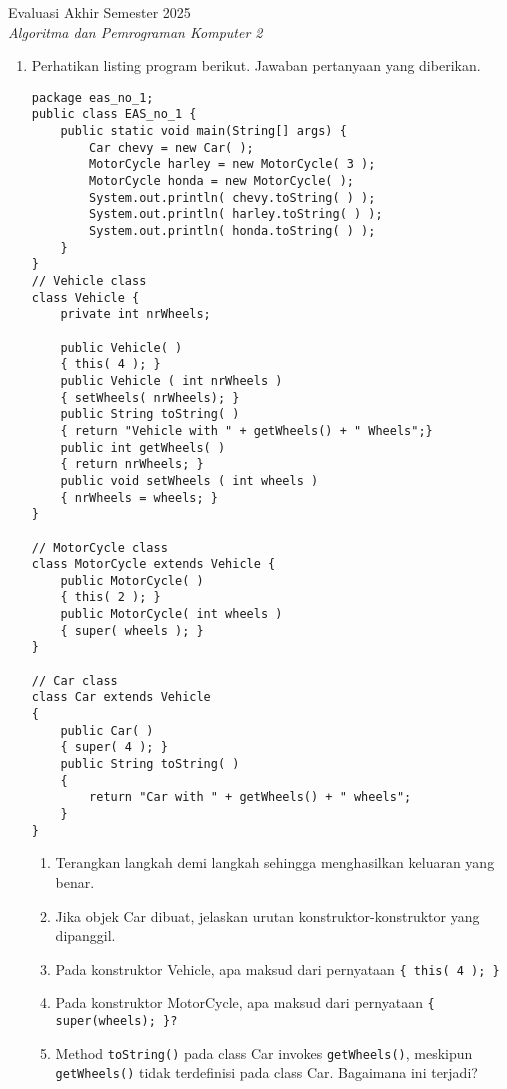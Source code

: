 \documentclass[12pt]{article}
\begin{document}
\begin{center}
    {Evaluasi Akhir Semester 2025}\\
    \textit{Algoritma dan Pemrograman Komputer 2}\\
\end{center}

\vspace{0.1cm}

\begin{enumerate}
    \item Perhatikan listing program berikut. Jawaban pertanyaan yang diberikan.
    
    \begin{lstlisting}
package eas_no_1;
public class EAS_no_1 {
    public static void main(String[] args) {
        Car chevy = new Car( );
        MotorCycle harley = new MotorCycle( 3 );
        MotorCycle honda = new MotorCycle( );
        System.out.println( chevy.toString( ) );
        System.out.println( harley.toString( ) );
        System.out.println( honda.toString( ) );
    }
}
// Vehicle class
class Vehicle {
    private int nrWheels;
    
    public Vehicle( )
    { this( 4 ); }
    public Vehicle ( int nrWheels )
    { setWheels( nrWheels); }
    public String toString( )
    { return "Vehicle with " + getWheels() + " Wheels";}
    public int getWheels( )
    { return nrWheels; }
    public void setWheels ( int wheels )
    { nrWheels = wheels; }
}

// MotorCycle class
class MotorCycle extends Vehicle {
    public MotorCycle( )
    { this( 2 ); }
    public MotorCycle( int wheels )
    { super( wheels ); }
}

// Car class
class Car extends Vehicle
{
    public Car( )
    { super( 4 ); }
    public String toString( )
    {
        return "Car with " + getWheels() + " wheels";
    }
}
    \end{lstlisting}

    \begin{enumerate}[label=\alph*)]
        \item Terangkan langkah demi langkah sehingga menghasilkan keluaran yang benar.
        \item Jika objek Car dibuat, jelaskan urutan konstruktor-konstruktor yang dipanggil.
        \item Pada konstruktor Vehicle, apa maksud dari pernyataan \texttt{\{ this( 4 ); \}}
        \item Pada konstruktor MotorCycle, apa maksud dari pernyataan \texttt{\{ super(wheels); \}?}
        \item Method \texttt{toString()} pada class Car invokes \texttt{getWheels()}, meskipun \texttt{getWheels()} tidak terdefinisi pada class Car. Bagaimana ini terjadi?
    \end{enumerate}


\end{enumerate}
\end{document}
